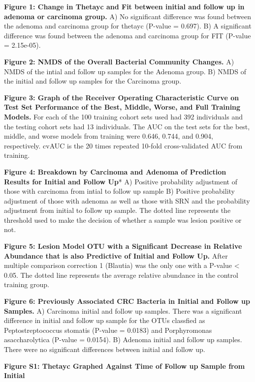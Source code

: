 \documentclass[12pt,]{article}
\begin{document}
\newpage

\textbf{Figure 1: Change in Thetayc and Fit between initial and follow
up in adenoma or carcinoma group.} A) No significant difference was
found between the adenoma and carcinoma group for thetayc (P-value =
0.697). B) A significant difference was found between the adenoma and
carcinoma group for FIT (P-value = 2.15e-05).

\textbf{Figure 2: NMDS of the Overall Bacterial Community Changes.} A)
NMDS of the intial and follow up samples for the Adenoma group. B) NMDS
of the initial and follow up samples for the Carcinoma group.

\textbf{Figure 3: Graph of the Receiver Operating Characteristic Curve
on Test Set Performance of the Best, Middle, Worse, and Full Training
Models.} For each of the 100 training cohort sets used had 392
individuals and the testing cohort sets had 13 individuals. The AUC on
the test sets for the best, middle, and worse models from training were
0.646, 0.744, and 0.904, respectively. cvAUC is the 20 times repeated
10-fold cross-validated AUC from training.

\textbf{Figure 4: Breakdown by Carcinoma and Adenoma of Prediction
Results for Initial and Follow Up}* A) Positive probability adjustment
of those with carcinoma from intial to follow up sample B) Positive
probability adjustment of those with adenoma as well as those with SRN
and the probability adjustment from initial to follow up sample. The
dotted line represents the threshold used to make the decision of
whether a sample was lesion positive or not.

\textbf{Figure 5: Lesion Model OTU with a Significant Decrease in
Relative Abundance that is also Predictive of Initial and Follow Up.}
After multiple comparison correction 1 (Blautia) was the only one with a
P-value \textless{} 0.05. The dotted line represents the average
relative abundance in the control training group.

\textbf{Figure 6: Previously Associated CRC Bacteria in Initial and
Follow up Samples.} A) Carcinoma initial and follow up samples. There
was a significant difference in initial and follow up sample for the
OTUs classfied as Peptostreptococcus stomatis (P-value = 0.0183) and
Porphyromonas asaccharolytica (P-value = 0.0154). B) Adenoma initial and
follow up samples. There were no significant differences between initial
and follow up.

\newpage

\textbf{Figure S1: Thetayc Graphed Against Time of Follow up Sample from
Initial}
\end{document}
